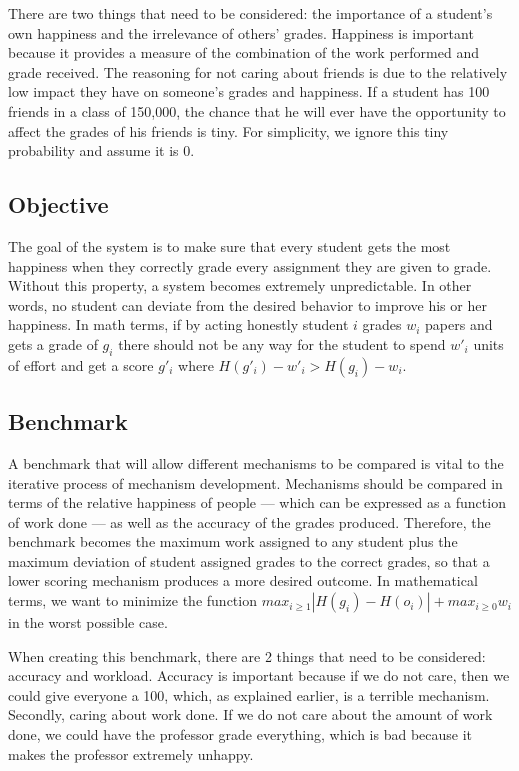 \documentclass[12pt, Arial]{article}
\begin{document}
There are two things that need to be considered: the importance of a student's own happiness and the irrelevance of others' grades. Happiness is important because it provides a measure of the combination of the work performed and grade received. The reasoning for not caring about friends is due to the relatively low impact they have on someone's grades and happiness. If a student has 100 friends in a class of 150,000, the chance that he will ever have the opportunity to affect the grades of his friends is tiny. For simplicity, we ignore this tiny probability and assume it is 0.

\subsection{Objective}
The goal of the system is to make sure that every student gets the most happiness when they correctly grade every assignment they are given to grade. Without this property, a system becomes extremely unpredictable. In other words, no student can deviate from the desired behavior to improve his or her happiness. In math terms, if by acting honestly student $i$ grades $w_i$ papers and gets a grade of $g_i$ there should not be any way for the student to spend $w'_i$ units of effort and get a score $g'_i$ where $H(g'_i)-w'_i > H(g_i)-w_i$.

\subsection{Benchmark}
A benchmark that will allow different mechanisms to be compared is vital to the iterative process of mechanism development. Mechanisms should be compared in terms of the relative happiness of people --- which can be expressed as a function of work done --- as well as the accuracy of the grades produced. Therefore, the benchmark becomes the maximum work assigned to any student plus the maximum deviation of student assigned grades to the correct grades, so that a lower scoring mechanism produces a more desired outcome. In mathematical terms, we want to minimize the function $max_{i \ge 1} |H(g_i)-H(o_i)| + max_{i \ge 0} w_i$ in the worst possible case.

When creating this benchmark, there are 2 things that need to be considered: accuracy and workload. Accuracy is important because if we do not care, then we could give everyone a 100, which, as explained earlier, is a terrible mechanism. Secondly, caring about work done. If we do not care about the amount of work done, we could have the professor grade everything, which is bad because it makes the professor extremely unhappy. 
\end{document}
